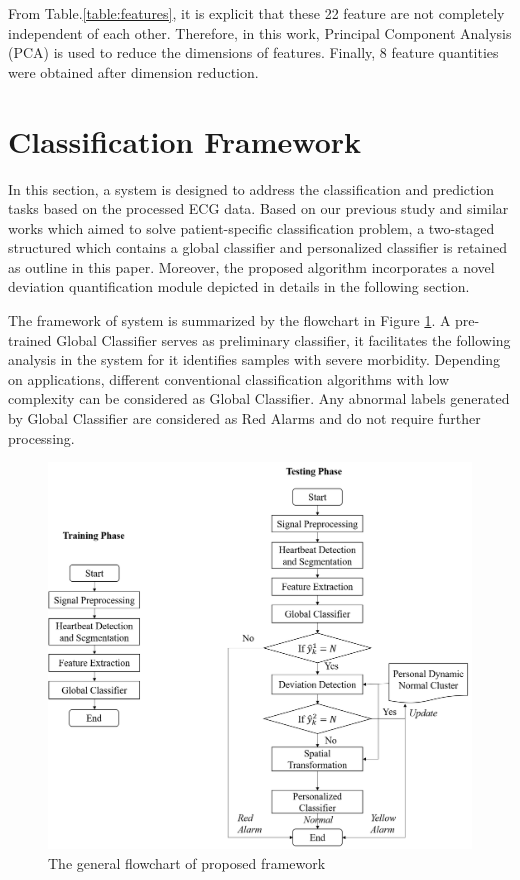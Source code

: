 From Table.\ref{table:features}, it is explicit that these 22 feature are not completely independent of each other. Therefore, in this work, Principal Component Analysis (PCA) is used to reduce the dimensions of features. Finally, 8 feature quantities were obtained after dimension reduction.


\section{Classification Framework}

In this section, a system is designed to address the classification and prediction tasks based on the processed ECG data. Based on our previous study and similar works which aimed to solve patient-specific classification problem, a two-staged structured which contains a global classifier and personalized classifier is retained as outline in this paper\cite{chen2018predictive,Hu_et_al,deChazal2006,llamedo2012automatic}. Moreover, the proposed algorithm incorporates a novel deviation quantification module depicted in details in the following section. 

The framework of system is summarized by the flowchart in Figure \ref{fig:flow}. A pre-trained Global Classifier serves as preliminary classifier, it facilitates the following analysis in the system for it identifies samples with severe morbidity. Depending on applications, different conventional classification algorithms with low complexity can be considered as Global Classifier. Any abnormal labels generated by Global Classifier are considered as Red Alarms and do not require further processing.

\begin{figure}[h]
	\centering
	\includegraphics[scale=.5]{Fig/flow2.png}
	\caption{The general flowchart of proposed framework}
	\label{fig:flow}
\end{figure}

